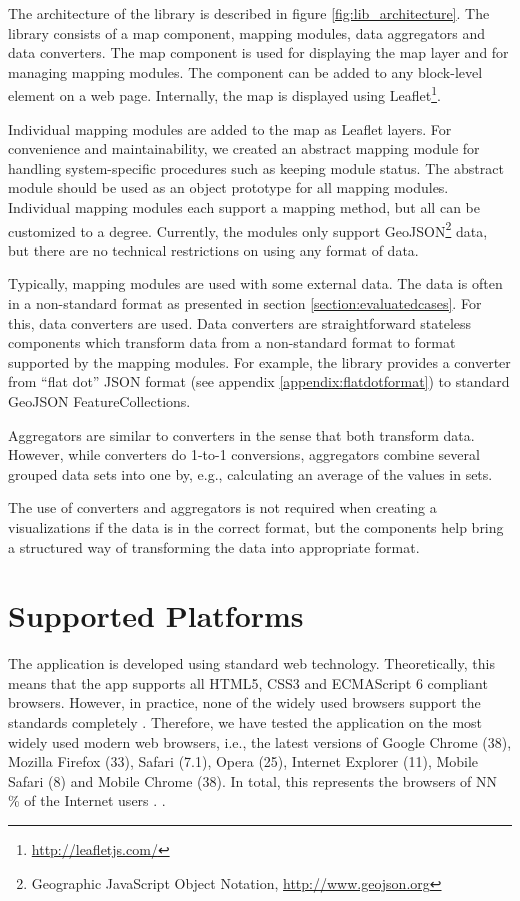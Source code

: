 The architecture of the library is described in figure \ref{fig:lib_architecture}. The library consists of a map component, mapping modules, data aggregators and data converters. The map component is used for displaying the map layer and for managing mapping modules. The component can be added to any block-level element on a web page. Internally, the map is displayed using Leaflet\footnote{\url{http://leafletjs.com/}}. 

Individual mapping modules are added to the map as Leaflet layers. For convenience and maintainability, we created an abstract mapping module for handling system-specific procedures such as keeping module status. The abstract module should be used as an object prototype for all mapping modules. Individual mapping modules each support a mapping method, but all can be customized to a degree. Currently, the modules only support GeoJSON\footnote{Geographic JavaScript Object Notation, \url{http://www.geojson.org}} data, but there are no technical restrictions on using any format of data.

Typically, mapping modules are used with some external data. The data is often in a non-standard format as presented in section \ref{section:evaluatedcases}. For this, data converters are used. Data converters are straightforward stateless components which transform data from a non-standard format to format supported by the mapping modules. For example, the library provides a converter from ``flat dot'' JSON format (see appendix \ref{appendix:flatdotformat}) to standard GeoJSON FeatureCollections.

Aggregators are similar to converters in the sense that both transform data. However, while converters do 1-to-1 conversions, aggregators combine several grouped data sets into one by, e.g., calculating an average of the values in sets.
	
The use of converters and aggregators is not required when creating a visualizations if the data is in the correct format, but the components help bring a structured way of transforming the data into appropriate format.

\section{Supported Platforms}

The application is developed using standard web technology. Theoretically, this means that the app supports all HTML5, CSS3 and ECMAScript 6 compliant browsers. However, in practice, none of the widely used browsers support the standards completely \citep{manian_html5_2011}. Therefore, we have tested the application on the most widely used modern web browsers, i.e., the latest versions of Google Chrome (38), Mozilla Firefox (33), Safari (7.1), Opera (25), Internet Explorer (11), Mobile Safari (8) and Mobile Chrome (38). In total, this represents the browsers of NN \% of the Internet users \citep{statcounter_globalstats_2014}. .

